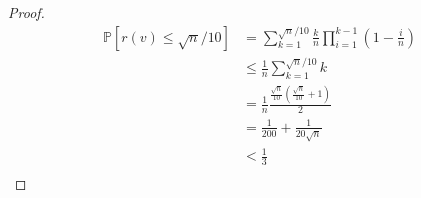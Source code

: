 \documentclass[a4paper, oneside, 11pt]{article}
\theoremstyle{definition}
\newcommand{\pr}{\mathbb{P}}
\begin{document}
\begin{enumerate}
\begin{proof}
      \begin{align*}
         \pr[r(v) \leq \sqrt{n}/10]
            &= \sum_{k=1}^{\sqrt{n}/10} \frac{k}{n} \prod_{i=1}^{k-1} \left(1 -
               \frac{i}{n} \right)\\
            &\leq \frac{1}{n} \sum_{k=1}^{\sqrt{n}/10} k\\
            &=\frac{1}{n} \frac{\frac{\sqrt{n}}{10} \left( \frac{\sqrt{n}}{10} + 1 \right)}{2}\\
            &= \frac{1}{200} + \frac{1}{20\sqrt{n}}\\
            &< \frac{1}{3}\\
      \end{align*}



\end{proof}
\end{enumerate}
\end{document}
